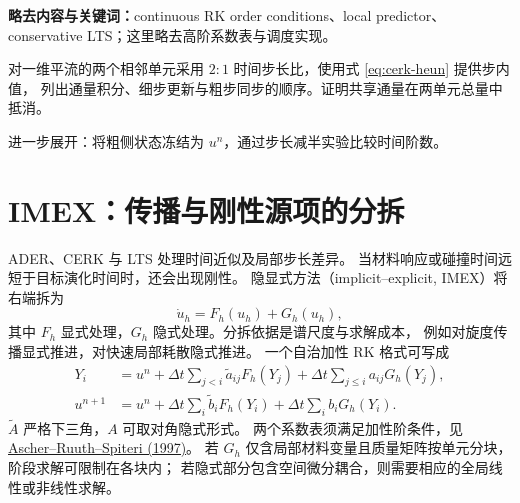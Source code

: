 \documentclass[UTF8,11pt,openany]{ctexbook}
\numberwithin{equation}{chapter}
\theoremstyle{definition}
\theoremstyle{remark}
\begin{document}
\begin{askai}
\textbf{略去内容与关键词：}continuous RK order conditions、local predictor、conservative LTS；这里略去高阶系数表与调度实现。

对一维平流的两个相邻单元采用 $2:1$ 时间步长比，使用式 \eqref{eq:cerk-heun} 提供步内值，
列出通量积分、细步更新与粗步同步的顺序。证明共享通量在两单元总量中抵消。

进一步展开：将粗侧状态冻结为 $u^n$，通过步长减半实验比较时间阶数。
\end{askai}

\section{IMEX：传播与刚性源项的分拆}\label{sec:imex}
ADER、CERK 与 LTS 处理时间近似及局部步长差异。
当材料响应或碰撞时间远短于目标演化时间时，还会出现刚性。
隐显式方法（implicit--explicit, IMEX）将右端拆为
\begin{equation}\label{eq:imex-split}
\dot u_h=F_h(u_h)+G_h(u_h),
\end{equation}
其中 $F_h$ 显式处理，$G_h$ 隐式处理。分拆依据是谱尺度与求解成本，
例如对旋度传播显式推进，对快速局部耗散隐式推进。
一个自治加性 RK 格式可写成
\begin{equation}\label{eq:imex-rk}
\begin{aligned}
Y_i&=u^n+\Delta t\sum_{j<i}\widetilde a_{ij}F_h(Y_j)
           +\Delta t\sum_{j\le i}a_{ij}G_h(Y_j),\\
u^{n+1}&=u^n+\Delta t\sum_i\widetilde b_iF_h(Y_i)
              +\Delta t\sum_i b_iG_h(Y_i).
\end{aligned}
\end{equation}
$\widetilde A$ 严格下三角，$A$ 可取对角隐式形式。
两个系数表须满足加性阶条件，见
\href{https://doi.org/10.1016/S0168-9274(97)00056-1}{Ascher--Ruuth--Spiteri (1997)}。
若 $G_h$ 仅含局部材料变量且质量矩阵按单元分块，阶段求解可限制在各块内；
若隐式部分包含空间微分耦合，则需要相应的全局线性或非线性求解。
\end{document}
